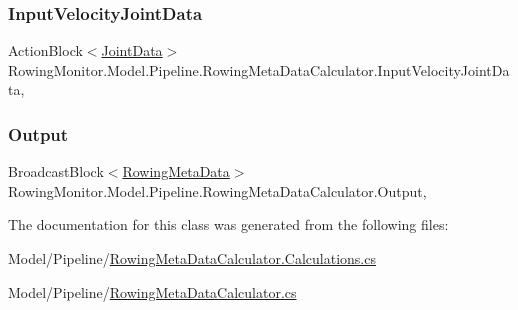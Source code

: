 \subsubsection{\texorpdfstring{Input\+Velocity\+Joint\+Data}{InputVelocityJointData}}
{\footnotesize\ttfamily Action\+Block$<$\hyperlink{struct_rowing_monitor_1_1_model_1_1_util_1_1_joint_data}{Joint\+Data}$>$ Rowing\+Monitor.\+Model.\+Pipeline.\+Rowing\+Meta\+Data\+Calculator.\+Input\+Velocity\+Joint\+Data\hspace{0.3cm}{\ttfamily [get]}, {\ttfamily [set]}}

\mbox{\label{class_rowing_monitor_1_1_model_1_1_pipeline_1_1_rowing_meta_data_calculator_ad3df3f9628998716d78822a6cd424a62}} 
\subsubsection{\texorpdfstring{Output}{Output}}
{\footnotesize\ttfamily Broadcast\+Block$<$\hyperlink{struct_rowing_monitor_1_1_model_1_1_util_1_1_rowing_meta_data}{Rowing\+Meta\+Data}$>$ Rowing\+Monitor.\+Model.\+Pipeline.\+Rowing\+Meta\+Data\+Calculator.\+Output\hspace{0.3cm}{\ttfamily [get]}, {\ttfamily [set]}}



The documentation for this class was generated from the following files\+:\begin{DoxyCompactItemize}
\item 
Model/\+Pipeline/\hyperlink{_rowing_meta_data_calculator_8_calculations_8cs}{Rowing\+Meta\+Data\+Calculator.\+Calculations.\+cs}\item 
Model/\+Pipeline/\hyperlink{_rowing_meta_data_calculator_8cs}{Rowing\+Meta\+Data\+Calculator.\+cs}\end{DoxyCompactItemize}

